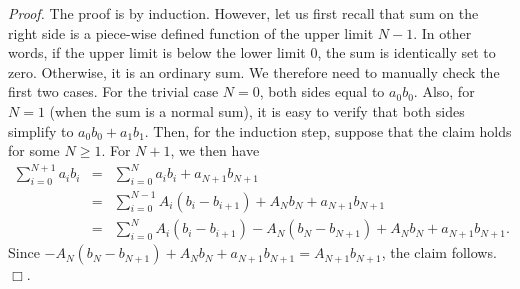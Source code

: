 \documentclass[12pt]{article}
\begin{document}
\emph{Proof.} The proof is by induction. However, let us
first recall that sum on the right side is  a
piece-wise defined function of the upper limit $N-1$.
In other words, if the upper limit is below the lower 
limit $0$, the sum is identically set to zero. 
Otherwise, it is an ordinary sum.
We therefore need to manually check the first two cases.
For the trivial case $N=0$, both sides equal to $a_0 b_0$.
Also, for $N=1$ (when the sum is a normal sum), it is easy to verify that
both sides simplify to $a_0 b_0 + a_1 b_1$.
Then, for the induction step, suppose that the
claim holds for some $N\ge 1$. For $N+1$, we then have
\begin{eqnarray*}
\sum_{i=0}^{N+1} a_i b_i &=& \sum_{i=0}^{N} a_i b_i + a_{N+1} b_{N+1} \\
&=& \sum_{i=0}^{N-1}A_i(b_i-b_{i+1})+A_N b_N + a_{N+1} b_{N+1} \\
&=& \sum_{i=0}^{N}A_i(b_i-b_{i+1})-A_{N}(b_{N}-b_{N+1})+ A_N b_N + a_{N+1} b_{N+1}.
\end{eqnarray*}
Since $-A_{N}(b_{N}-b_{N+1})+ A_N b_N + a_{N+1} b_{N+1} = A_{N+1} b_{N+1}$,
the claim follows. $\Box$.
\end{document}
